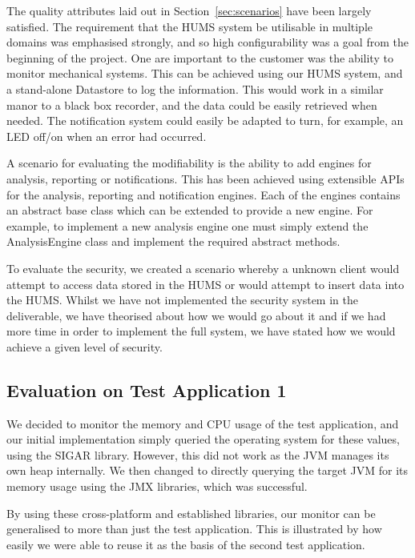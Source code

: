 \documentclass[10pt,a4paper]{article}
\begin{document}
The quality attributes laid out in Section~\ref{sec:scenarios} have been largely satisfied. The requirement that the HUMS system be utilisable in multiple domains was emphasised strongly, and so high configurability was a goal from the beginning of the project. One are important to the customer was the ability to monitor mechanical systems. This can be achieved using our HUMS system, and a stand-alone Datastore to log the information. This would work in a similar manor to a black box recorder, and the data could be easily retrieved when needed. The notification system could easily be adapted to turn, for example, an LED off/on when an error had occurred.

A scenario for evaluating the modifiability is the ability to add engines for analysis, reporting or notifications. This has been achieved using extensible APIs for the analysis, reporting and notification engines. Each of the engines contains an abstract base class which can be extended to provide a new engine. For example, to implement a new analysis engine one must simply extend the AnalysisEngine class and implement the required abstract methods.

To evaluate the security, we created a scenario whereby a unknown client would attempt to access data stored in the HUMS or would attempt to insert data into the HUMS. Whilst we have not implemented the security system in the deliverable, we have theorised about how we would go about it and if we had more time in order to implement the full system, we have stated how we would achieve a given level of security.

\subsection{Evaluation on Test Application 1}
\label{sec:test_app1}

We decided to monitor the memory and CPU usage of the test application, and our initial implementation simply queried the operating system for these values, using the SIGAR library. However, this did not work as the JVM manages its own heap internally. We then changed to directly querying the target JVM for its memory usage using the JMX libraries, which was successful.

By using these cross-platform and established libraries, our monitor can be generalised to more than just the test application. This is illustrated by how easily we were able to reuse it as the basis of the second test application.
\end{document}

